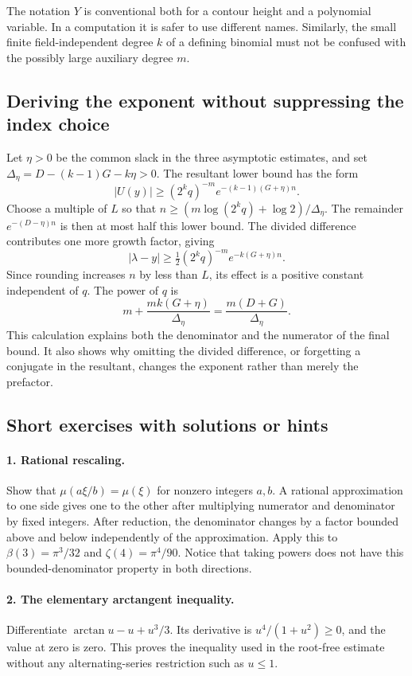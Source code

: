 The notation \(Y\) is conventional both for a contour height and a
polynomial variable. In a computation it is safer to use different
names. Similarly, the small finite field-independent degree \(k\)
of a defining binomial must not be confused with the possibly
large auxiliary degree \(m\).

\subsection{Deriving the exponent without suppressing the index choice}

Let \(\eta>0\) be the common slack in the three asymptotic
estimates, and set \(\Delta_\eta=D-(k-1)G-k\eta>0\).
The resultant lower bound has the form
\[
|U(y)|\ge(2^kq)^{-m}e^{-(k-1)(G+\eta)n}.
\]
Choose a multiple of \(L\) so that
\(n\ge(m\log(2^kq)+\log2)/\Delta_\eta\). The remainder
\(e^{-(D-\eta)n}\) is then at most half this lower bound.
The divided difference contributes one more growth factor,
giving
\[
|\lambda-y|\ge\tfrac12(2^kq)^{-m}e^{-k(G+\eta)n}.
\]
Since rounding increases \(n\) by less than \(L\), its effect is
a positive constant independent of \(q\). The power of \(q\) is
\[
m+\frac{mk(G+\eta)}{\Delta_\eta}
=\frac{m(D+G)}{\Delta_\eta}.
\]
This calculation explains both the denominator and the numerator
of the final bound. It also shows why omitting the divided
difference, or forgetting a conjugate in the resultant, changes
the exponent rather than merely the prefactor.

\subsection{Short exercises with solutions or hints}

\paragraph{1. Rational rescaling.}
Show that \(\mu(a\xi/b)=\mu(\xi)\) for nonzero integers
\(a,b\). A rational approximation to one side gives one to the
other after multiplying numerator and denominator by fixed
integers. After reduction, the denominator changes by a factor
bounded above and below independently of the approximation.
Apply this to \(\beta(3)=\pi^3/32\) and
\(\zeta(4)=\pi^4/90\). Notice that taking powers does not have
this bounded-denominator property in both directions.

\paragraph{2. The elementary arctangent inequality.}
Differentiate \(\arctan u-u+u^3/3\). Its derivative is
\(u^4/(1+u^2)\ge0\), and the value at zero is zero.
This proves the inequality used in the root-free estimate without
any alternating-series restriction such as \(u\le1\).

